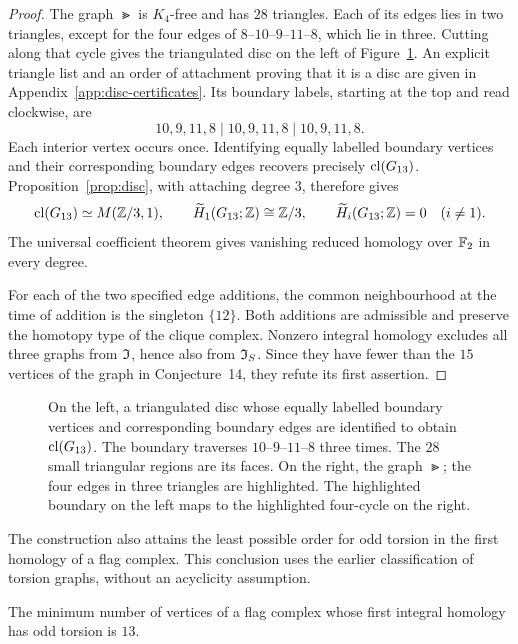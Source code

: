 \begin{proof}
The graph $\Gt$ is $K_4$-free and has $28$ triangles. Each of its edges
lies in two triangles, except for the four edges of
$8\text{--}10\text{--}9\text{--}11\text{--}8$, which lie in three.
Cutting along that cycle gives the triangulated disc on the left of
Figure~\ref{fig:G13}. An explicit triangle list and an order of attachment
proving that it is a disc are given in
Appendix~\ref{app:disc-certificates}.
Its boundary labels, starting at the top and read clockwise, are
\[
 10,9,11,8\mid10,9,11,8\mid10,9,11,8.
\]
Each interior vertex occurs once. Identifying equally labelled boundary
vertices and their corresponding boundary edges recovers precisely
$\operatorname{cl}(G_{13})$.
Proposition~\ref{prop:disc}, with attaching degree $3$, therefore gives
\[
 \operatorname{cl}(G_{13})\simeq M(\mathbb Z/3,1),\qquad
 \widetilde H_1(G_{13};\mathbb Z)\cong\mathbb Z/3,
 \qquad \widetilde H_i(G_{13};\mathbb Z)=0\quad(i\ne1).
\]
The universal coefficient theorem gives vanishing reduced homology
over $\mathbb F_2$ in every degree.

For each of the two specified edge additions, the common neighbourhood
at the time of addition is the singleton $\{12\}$. Both additions are
admissible and preserve the homotopy type of the clique complex.
Nonzero integral homology excludes all three graphs from $\mathfrak I$, hence
also from $\mathfrak I_S$. Since they have fewer than the $15$ vertices of the
graph in Conjecture~14, they refute its first assertion.
\end{proof}

\begin{figure}[tbp]
\centering
\hspace{6mm}
\caption{On the left, a triangulated disc whose equally labelled boundary
vertices and corresponding boundary edges are identified to obtain
$\operatorname{cl}(G_{13})$. The boundary traverses
$10$--$9$--$11$--$8$ three times. The $28$ small triangular regions are
its faces. On the right, the graph $\Gt$; the four edges in three
triangles are highlighted. The highlighted boundary on the left maps
to the highlighted four-cycle on the right.}\label{fig:G13}
\end{figure}

The construction also attains the least possible order for odd torsion
in the first homology of a flag complex. This conclusion uses the
earlier classification of torsion graphs, without an acyclicity
assumption.

\begin{proposition}\label{rem:adamaszek}
The minimum number of vertices of a flag complex whose first integral
homology has odd torsion is $13$.
\end{proposition}

